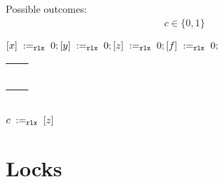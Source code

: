 \begin{minipage}[t]{0.3\linewidth}
Possible outcomes:\\
\[\begin{array}{l}
  c \in \{0, 1\}
\end{array}\]
\end{minipage}
%
\codePrefix
  $[x] \;:=_{\mathtt{rlx}}\;0;
  [y] \;:=_{\mathtt{rlx}}\;0;
  [z] \;:=_{\mathtt{rlx}}\;0;
  [f] \;:=_{\mathtt{rlx}}\;0;$ \\
  \begin{tabular}{L || L}
    \begin{array}{@{}l@{}}
      ; \\
    \end{array} &

    \begin{array}{@{}l@{}}
      ; \\
    \end{array}
  \end{tabular} \\
  $c \;:=_{\mathtt{rlx}}\;[z]$
\codePostfix
\litmusTestEnd

\section{Locks}
\label{app:locks}

